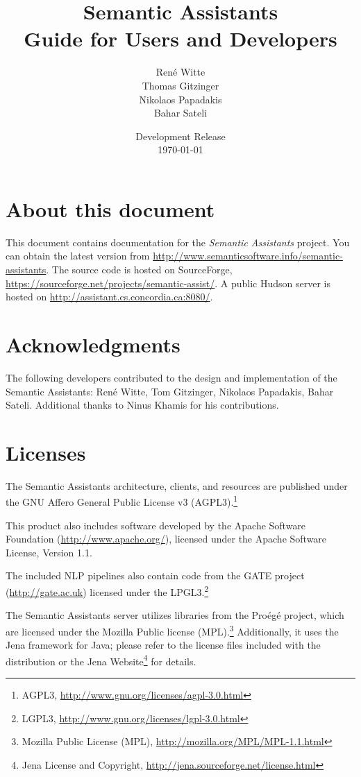 \documentclass[10pt,twoside,openany,bibtotoc,liststotoc,chapterprefix]{scrbook}
\title{Semantic Assistants\bigskip\\
\Large Guide for Users and Developers}
\author{Ren\'{e} Witte\\
Thomas Gitzinger\\
Nikolaos Papadakis\\
Bahar Sateli
\medskip}
\date{Development Release\\
\today
}
\begin{document}
\frontmatter
\maketitle
{}\tableofcontents

\section*{About this document}
This document contains documentation for the \emph{Semantic
  Assistants} project. You can obtain the latest version from
\url{http://www.semanticsoftware.info/semantic-assistants}. The source
code is hosted on SourceForge,
\url{https://sourceforge.net/projects/semantic-assist/}.  A public
Hudson server is hosted on
\url{http://assistant.cs.concordia.ca:8080/}.

\section*{Acknowledgments}
The following developers contributed to the design and implementation
of the Semantic Assistants: Ren\'{e} Witte, Tom Gitzinger, Nikolaos
Papadakis, Bahar Sateli. Additional thanks to Ninus Khamis for
his contributions.

\section*{Licenses}
The Semantic Assistants architecture, clients, and resources are
published under the GNU Affero General Public License v3
(AGPL3).\footnote{AGPL3,
  \url{http://www.gnu.org/licenses/agpl-3.0.html}}

This product also includes software developed by the Apache Software
Foundation (\url{http://www.apache.org/}), licensed under the Apache
Software License, Version 1.1.

The included NLP pipelines also contain code from the GATE project
(\url{http://gate.ac.uk}) licensed under the LPGL3.\footnote{LGPL3, \url{http://www.gnu.org/licenses/lgpl-3.0.html}}

The Semantic Assistants server utilizes libraries from the Pro\'eg\'e
project, which are licensed under the Mozilla Public license
(MPL).\footnote{Mozilla Public License (MPL),
  \url{http://mozilla.org/MPL/MPL-1.1.html}} Additionally, it uses
the Jena framework for Java; please refer to the license files included with
the distribution or the Jena Website\footnote{Jena License and
  Copyright, \url{http://jena.sourceforge.net/license.html}} for details.

\mainmatter








\backmatter
\appendix


\end{document}
